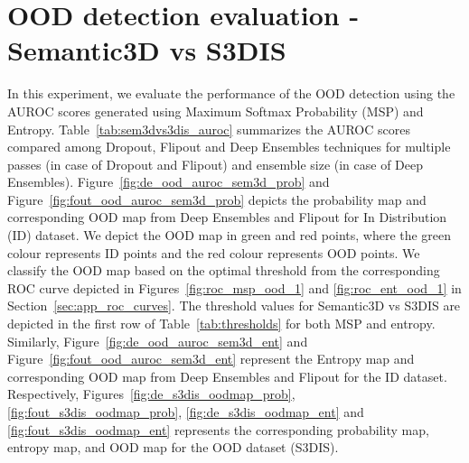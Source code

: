     \section{OOD detection evaluation - Semantic3D vs S3DIS}
    In this experiment, we evaluate the performance of the OOD detection using the AUROC scores generated using Maximum Softmax Probability (MSP) and Entropy.
    Table~\ref{tab:sem3dvs3dis_auroc} summarizes the AUROC scores compared among Dropout, Flipout and Deep Ensembles techniques for multiple passes (in case of Dropout and Flipout) and ensemble size (in case of Deep Ensembles).
    Figure~\ref{fig:de_ood_auroc_sem3d_prob} and Figure~\ref{fig:fout_ood_auroc_sem3d_prob} depicts the probability map and corresponding OOD map from Deep Ensembles and Flipout for In Distribution (ID) dataset.
    We depict the OOD map in green and red points, where the green colour represents ID points and the red colour represents OOD points.
    We classify the OOD map based on the optimal threshold from the corresponding ROC curve depicted in Figures~\ref{fig:roc_msp_ood_1} and \ref{fig:roc_ent_ood_1} in Section~\ref{sec:app_roc_curves}.
    The threshold values for Semantic3D vs S3DIS are depicted in the first row of Table~\ref{tab:thresholds} for both MSP and entropy.
    Similarly, Figure~\ref{fig:de_ood_auroc_sem3d_ent} and Figure~\ref{fig:fout_ood_auroc_sem3d_ent} represent the Entropy map and corresponding OOD map from Deep Ensembles and Flipout for the ID dataset.
    Respectively, Figures~\ref{fig:de_s3dis_oodmap_prob}, \ref{fig:fout_s3dis_oodmap_prob}, \ref{fig:de_s3dis_oodmap_ent} and \ref{fig:fout_s3dis_oodmap_ent} represents the corresponding probability map, entropy map, and OOD map for the OOD dataset (S3DIS).
    
